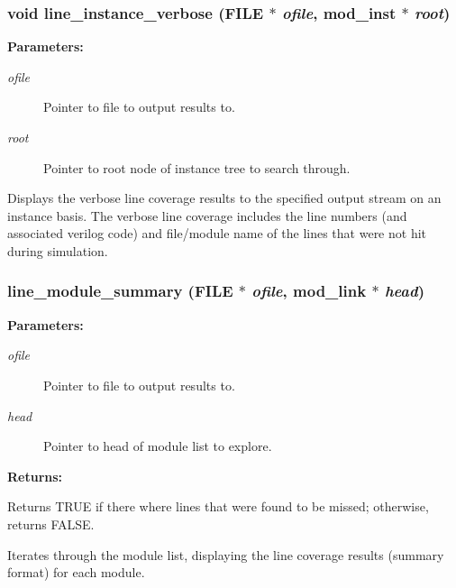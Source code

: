 \subsubsection{\setlength{\rightskip}{0pt plus 5cm}void line\_\-instance\_\-verbose (FILE $\ast$ {\em ofile}, {\bf mod\_\-inst} $\ast$ {\em root})}\label{line_8c_a9}


\begin{Desc}
\item[{\bf Parameters: }]\par
\begin{description}
\item[
{\em ofile}]Pointer to file to output results to. \item[
{\em root}]Pointer to root node of instance tree to search through.

\end{description}
\end{Desc}
Displays the verbose line coverage results to the specified output stream on an instance basis. The verbose line coverage includes the line numbers  (and associated verilog code) and file/module name of the lines that were  not hit during simulation. 
\subsubsection{ line\_\-module\_\-summary (FILE $\ast$ {\em ofile}, {\bf mod\_\-link} $\ast$ {\em head})}\label{line_8c_a7}


\begin{Desc}
\item[{\bf Parameters: }]\par
\begin{description}
\item[
{\em ofile}]Pointer to file to output results to. \item[
{\em head}]Pointer to head of module list to explore.

\end{description}
\end{Desc}
\begin{Desc}
\item[{\bf Returns: }]\par
Returns TRUE if there where lines that were found to be missed; otherwise, returns FALSE.

\end{Desc}
Iterates through the module list, displaying the line coverage results (summary format) for each module. 
